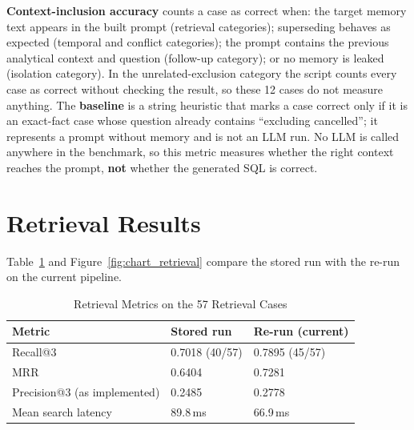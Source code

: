 \textbf{Context-inclusion accuracy} counts a case as correct when: the target memory text
appears in the built prompt (retrieval categories); superseding behaves as expected
(temporal and conflict categories); the prompt contains the previous analytical context and
question (follow-up category); or no memory is leaked (isolation category). In the
unrelated-exclusion category the script counts every case as correct without checking the
result, so these 12 cases do not measure anything. The \textbf{baseline} is a string
heuristic that marks a case correct only if it is an exact-fact case whose question already
contains ``excluding cancelled''; it represents a prompt without memory and is not an LLM
run. No LLM is called anywhere in the benchmark, so this metric measures whether the right
context reaches the prompt, \textbf{not} whether the generated SQL is correct.

\section{Retrieval Results}
Table~\ref{tab:retrieval} and Figure~\ref{fig:chart_retrieval} compare the stored run with
the re-run on the current pipeline.

\begin{table}[H]
    \centering
    \small
    \caption{Retrieval Metrics on the 57 Retrieval Cases}
    \begin{tabular}{p{5.2cm} p{3.6cm} p{3.6cm}}
        \toprule
        \textbf{Metric} & \textbf{Stored run} & \textbf{Re-run (current)} \\
        \midrule
        Recall@3                     & 0.7018 (40/57) & 0.7895 (45/57) \\[3pt]
        MRR                          & 0.6404         & 0.7281 \\[3pt]
        Precision@3 (as implemented) & 0.2485         & 0.2778 \\[3pt]
        Mean search latency          & 89.8\,ms       & 66.9\,ms \\
        \bottomrule
    \end{tabular}
    \label{tab:retrieval}
\end{table}

\begin{figure}[H]
    \centering
\end{figure}


